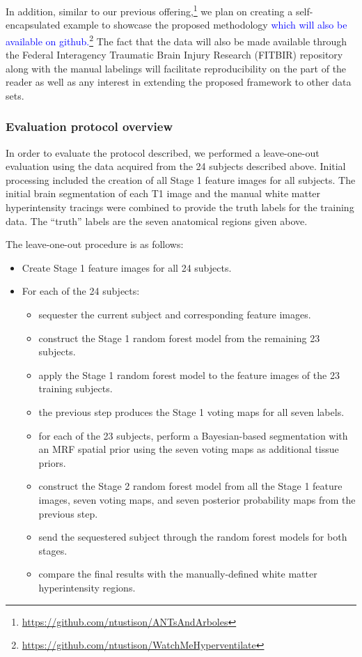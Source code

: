 \documentclass[11pt,]{article}
\providecommand{\tightlist}{%
  \setlength{\itemsep}{0pt}\setlength{\parskip}{0pt}}
\let\rmarkdownfootnote\footnote%
\def\footnote{\protect\rmarkdownfootnote}
\begin{document}
In addition, similar to our previous offering,\footnote{\url{https://github.com/ntustison/ANTsAndArboles}}
we plan on creating a self-encapsulated example to showcase the proposed
methodology
\textcolor{blue}{which will also be available on github.}\footnote{\url{https://github.com/ntustison/WatchMeHyperventilate}}
The fact that the data will also be made available through the Federal
Interagency Traumatic Brain Injury Research (FITBIR) repository along
with the manual labelings will facilitate reproducibility on the part of
the reader as well as any interest in extending the proposed framework
to other data sets.

\subsubsection{Evaluation protocol
overview}\label{evaluation-protocol-overview}

In order to evaluate the protocol described, we performed a
leave-one-out evaluation using the data acquired from the 24 subjects
described above. Initial processing included the creation of all Stage 1
feature images for all subjects. The initial brain segmentation of each
T1 image and the manual white matter hyperintensity tracings were
combined to provide the truth labels for the training data. The
``truth'' labels are the seven anatomical regions given above.

The leave-one-out procedure is as follows:

\begin{itemize}
\tightlist
\item
  Create Stage 1 feature images for all 24 subjects.
\item
  For each of the 24 subjects:

  \begin{itemize}
  \tightlist
  \item
    sequester the current subject and corresponding feature images.
  \item
    construct the Stage 1 random forest model from the remaining 23
    subjects.
  \item
    apply the Stage 1 random forest model to the feature images of the
    23 training subjects.
  \item
    the previous step produces the Stage 1 voting maps for all seven
    labels.
  \item
    for each of the 23 subjects, perform a Bayesian-based segmentation
    with an MRF spatial prior using the seven voting maps as additional
    tissue priors.
  \item
    construct the Stage 2 random forest model from all the Stage 1
    feature images, seven voting maps, and seven posterior probability
    maps from the previous step.
  \item
    send the sequestered subject through the random forest models for
    both stages.
  \item
    compare the final results with the manually-defined white matter
    hyperintensity regions.
  \end{itemize}
\end{itemize}
\end{document}
